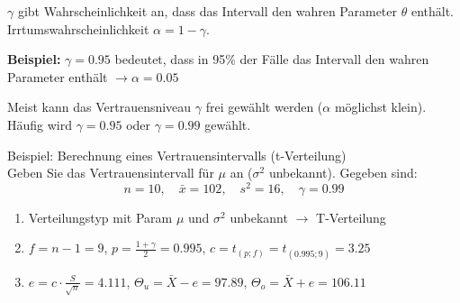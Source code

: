\begin{remark}
$\gamma$ gibt Wahrscheinlichkeit an, dass das Intervall den wahren Parameter $\theta$ enthält. Irrtumswahrscheinlichkeit $\alpha=1-\gamma$.

\textbf{Beispiel:} $\gamma=0.95$ bedeutet, dass in 95\% der Fälle das Intervall den wahren Parameter enthält $\rightarrow \alpha=0.05$

Meist kann das Vertrauensniveau $\gamma$ frei gewählt werden ($\alpha$ möglichst klein). Häufig wird $\gamma=0.95$ oder $\gamma=0.99$ gewählt.
\end{remark}

\begin{example2}{Beispiel: Berechnung eines Vertrauensintervalls (t-Verteilung)}\\
Geben Sie das Vertrauensintervall für $\mu$ an ($\sigma^2$ unbekannt). Gegeben sind:
$$
n=10, \quad \bar{x}=102, \quad s^2=16, \quad \gamma=0.99
$$

\begin{enumerate}
  \item Verteilungstyp mit Param $\mu$ und $\sigma^2$ unbekannt $\rightarrow$ T-Verteilung
  \item $f=n-1=9$, $p=\frac{1+\gamma}{2}=0.995$, $c=t_{(p;f)}=t_{(0.995;9)}=3.25$
  \item $e=c \cdot \frac{S}{\sqrt{n}}=4.111$, $\Theta_u=\bar{X}-e=97.89$, $\Theta_o=\bar{X}+e=106.11$
\end{enumerate}
\end{example2}

